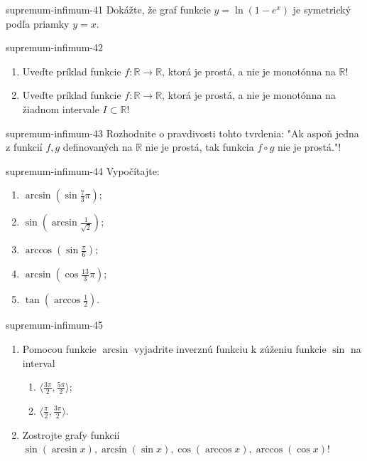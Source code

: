 \begin{defproblem}{supremum-infimum-41}
Dokážte, že graf funkcie $y=\ln (1-e^x)$ je symetrický podľa priamky $y=x$.
\end{defproblem}

\begin{defproblem}{supremum-infimum-42}
\begin{enumerate}
\item Uveďte príklad funkcie $f:\mathbb{R}\rightarrow\mathbb{R}$, ktorá je prostá, a nie je monotónna na $\mathbb{R}$!
\item Uveďte príklad funkcie $f:\mathbb{R}\rightarrow\mathbb{R}$, ktorá je prostá, a nie je monotónna na žiadnom intervale $I\subset\mathbb{R}$!
\end{enumerate}
\end{defproblem}

\begin{defproblem}{supremum-infimum-43}
Rozhodnite o pravdivosti tohto tvrdenia: "Ak aspoň jedna z funkcií $f,g$ definovaných na $\mathbb{R}$ nie je prostá, tak funkcia $f\circ g$ nie je prostá."!
\end{defproblem}

\begin{defproblem}{supremum-infimum-44}
Vypočítajte:
\begin{multicols}{2}
\begin{enumerate}
    \item $\arcsin(\sin \frac{7}{3}\pi)$;
    \item $\sin(\arcsin \frac{1}{\sqrt{2}})$;
    \item $\arccos(\sin \frac{\pi}{6})$;
    \item $\arcsin(\cos \frac{13}{3}\pi)$;
    \item $\tan(\arccos\frac{1}{2})$.
\end{enumerate}
\end{multicols}
\end{defproblem}

\begin{defproblem}{supremum-infimum-45}
\begin{enumerate}
\item Pomocou funkcie $\arcsin$ vyjadrite inverznú funkciu k zúženiu funkcie $\sin$ na interval 
\begin{enumerate}
\item $\langle\frac{3\pi}{2},\frac{5\pi}{2}\rangle$;
\item $\langle\frac{\pi}{2},\frac{3\pi}{2}\rangle$.
\end{enumerate}
\item Zostrojte grafy funkcií $\sin(\arcsin x),\arcsin(\sin x),\cos(\arccos x),\arccos(\cos x)$!
\end{enumerate}
\end{defproblem}

